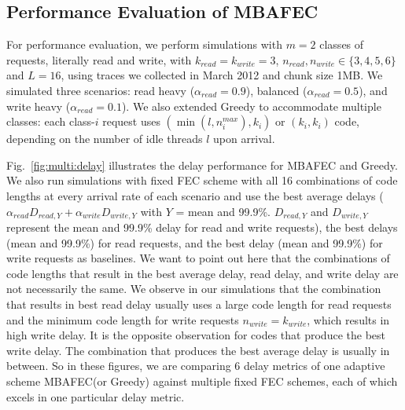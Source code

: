 \documentclass[journal]{IEEEtran}
\newcommand{\multiclass}{{MBAFEC}\xspace}
\begin{document}
\subsection{Performance Evaluation of \multiclass}
For performance evaluation, we perform simulations with $m=2$ classes of requests, literally read and write, with $k_{read}=k_{write}=3$, $n_{read},n_{write}\in\{3,4,5,6\}$ and $L=16$, using traces we collected in March 2012 and chunk size 1MB. We simulated three scenarios: read heavy ($\alpha_{read} = 0.9$), balanced ($\alpha_{read} = 0.5$), and write heavy ($\alpha_{read}=0.1$). We also extended Greedy to accommodate multiple classes: each class-$i$ request uses $(\min(l,n_i^{max}),k_i)$ or $(k_i,k_i)$ code, depending on the number of idle threads $l$ upon arrival.

Fig.~\ref{fig:multi:delay} illustrates the delay performance for \multiclass and Greedy. We also run simulations with fixed FEC scheme with all 16 combinations of code lengths at every arrival rate of each scenario and use the best average delays ($\alpha_{read}D_{read,Y} + \alpha_{write}D_{write,Y}$ with $Y$ = mean  and 99.9\%. $D_{read,Y}$ and $D_{write,Y}$ represent the mean and 99.9\% delay for read and write requests), the best delays (mean and 99.9\%) for read requests, and the best delay (mean and 99.9\%) for write requests as baselines. We want to point out here that the combinations of code lengths that result in the best average delay, read delay, and write delay are not necessarily the same. We observe in our simulations that the combination that results in best read delay usually uses a large code length for read requests and the minimum code length for write requests $n_{write} = k_{write}$, which results in high write delay. It is the opposite observation for codes that produce the best write delay. The combination that produces the best average delay is usually in between.
So in these figures, we are comparing 6 delay metrics of one adaptive scheme \multiclass (or Greedy) against multiple fixed FEC schemes, each of which excels in one particular delay metric.
\end{document}
